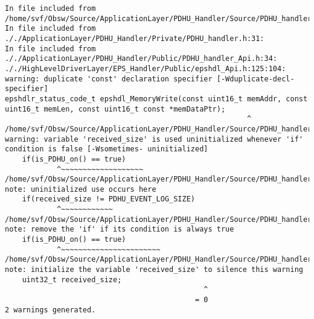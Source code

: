 
\noindent\begin{minipage}{\textwidth}
\begin{lstlisting}[language={}, caption=4th warning example., label=srciror_4]
In file included from /home/svf/Obsw/Source/ApplicationLayer/PDHU_Handler/Source/PDHU_handler.c:40:
In file included from ././ApplicationLayer/PDHU_Handler/Private/PDHU_handler.h:31:
In file included from ././ApplicationLayer/PDHU_Handler/Public/PDHU_handler_Api.h:34: ././HighLevelDriverLayer/EPS_Handler/Public/epshdl_Api.h:125:104: warning: duplicate 'const' declaration specifier [-Wduplicate-decl-specifier]
epshdlr_status_code_t epshdl_MemoryWrite(const uint16_t memAddr, const uint16_t memLen, const uint16_t const *memDataPtr);
														^
/home/svf/Obsw/Source/ApplicationLayer/PDHU_Handler/Source/PDHU_handler.c:1302:8: warning: variable 'received_size' is used uninitialized whenever 'if' condition is false [-Wsometimes- uninitialized]
	if(is_PDHU_on() == true) 
			^~~~~~~~~~~~~~~~~~~~
/home/svf/Obsw/Source/ApplicationLayer/PDHU_Handler/Source/PDHU_handler.c:1316:8: note: uninitialized use occurs here
	if(received_size != PDHU_EVENT_LOG_SIZE) 
			^~~~~~~~~~~~~
/home/svf/Obsw/Source/ApplicationLayer/PDHU_Handler/Source/PDHU_handler.c:1302:5: note: remove the 'if' if its condition is always true
	if(is_PDHU_on() == true)
			^~~~~~~~~~~~~~~~~~~~~~~~ 
/home/svf/Obsw/Source/ApplicationLayer/PDHU_Handler/Source/PDHU_handler.c:1300:27: note: initialize the variable 'received_size' to silence this warning
	uint32_t received_size; 
											  ^
										  	= 0
2 warnings generated.
\end{lstlisting}
\end{minipage}